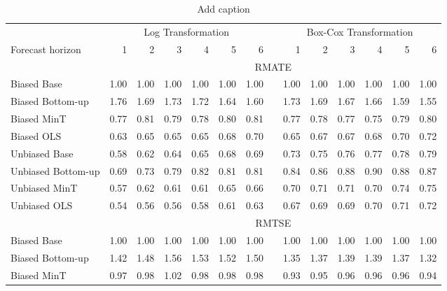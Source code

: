 \documentclass[12pt]{article}
\begin{document}
\begin{table}[htbp]
  \centering\footnotesize
  \caption{Add caption}
    \begin{tabular}{lrrrrrrrrrrrrr}
    \toprule
    & \multicolumn{6}{c}{Log Transformation}         &       & \multicolumn{6}{c}{Box-Cox Transformation} \\\cmidrule(lr){2-7}\cmidrule(lr){9-14}
    Forecast horizon  & 1     & 2     & 3     & 4     & 5     & 6     &       & 1     & 2     & 3     & 4     & 5     & 6 \\\midrule
          & \multicolumn{13}{c}{RMATE} \\ \cmidrule(lr){2-14}
    Biased Base             & 1.00  & 1.00  & 1.00  & 1.00  & 1.00  & 1.00  &       & 1.00  & 1.00  & 1.00  & 1.00  & 1.00  & 1.00 \\
    Biased Bottom-up        & 1.76  & 1.69  & 1.73  & 1.72  & 1.64  & 1.60  &       & 1.73  & 1.69  & 1.67  & 1.66  & 1.59  & 1.55 \\
    Biased MinT             & 0.77  & 0.81  & 0.79  & 0.78  & 0.80  & 0.81  &       & 0.77  & 0.78  & 0.77  & 0.75  & 0.79  & 0.80 \\
    Biased OLS              & 0.63  & 0.65  & 0.65  & 0.65  & 0.68  & 0.70  &       & 0.65  & 0.67  & 0.67  & 0.68  & 0.70  & 0.72 \\
    Unbiased Base           & 0.58  & 0.62  & 0.64  & 0.65  & 0.68  & 0.69  &       & 0.73  & 0.75  & 0.76  & 0.77  & 0.78  & 0.79 \\
    Unbiased Bottom-up      & 0.69  & 0.73  & 0.79  & 0.82  & 0.81  & 0.81  &       & 0.84  & 0.86  & 0.88  & 0.90  & 0.88  & 0.87 \\
    Unbiased MinT           & 0.57  & 0.62  & 0.61  & 0.61  & 0.65  & 0.66  &       & 0.70  & 0.71  & 0.71  & 0.70  & 0.74  & 0.75 \\
    Unbiased OLS            & 0.54  & 0.56  & 0.56  & 0.58  & 0.61  & 0.63  &       & 0.67  & 0.69  & 0.69  & 0.70  & 0.71  & 0.72 \\
          & \multicolumn{13}{c}{RMTSE} \\\cmidrule(lr){2-14}
    Biased Base             & 1.00  & 1.00  & 1.00  & 1.00  & 1.00  & 1.00  &       & 1.00  & 1.00  & 1.00  & 1.00  & 1.00  & 1.00 \\
    Biased Bottom-up        & 1.42  & 1.48  & 1.56  & 1.53  & 1.52  & 1.50  &       & 1.35  & 1.37  & 1.39  & 1.39  & 1.37  & 1.32 \\
    Biased MinT             & 0.97  & 0.98  & 1.02  & 0.98  & 0.98  & 0.98  &       & 0.93  & 0.95  & 0.96  & 0.96  & 0.96  & 0.94 \\

\end{tabular}
\end{table}
\end{document}
